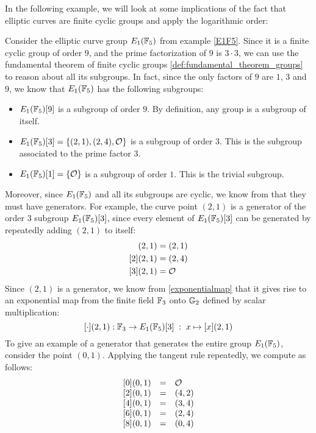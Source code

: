 In the following example, we will look at some implications of the fact that elliptic curves are finite cyclic groups and apply the logarithmic order:
\begin{example}\label{ex:G1G2-subgroups} Consider the elliptic curve group $E_1(\F_5)$ from example \ref{E1F5}. Since it is a finite cyclic group of order $9$, and the prime factorization of $9$ is $3\cdot 3$, we can use the fundamental theorem of finite cyclic groups \ref{def:fundamental_theorem_groups} to reason about all its subgroups. In fact, since the only  factors of $9$ are $1$, $3$ and $9$, we know that $E_1(\F_5)$ has the following subgroups:
\begin{itemize}
\item $E_1(\F_5)[9]$ is a subgroup of order $9$. By definition, any group is a subgroup of itself.
\item $E_1(\F_5)[3] = \{(2,1),(2,4),\Oinf\}$ is a subgroup of order $3$. This is the subgroup associated to the prime factor $3$.
\item $E_1(\F_5)[1] = \{\Oinf\}$ is a subgroup of order $1$. This is the trivial subgroup.
\end{itemize}
Moreover, since $E_1(\F_5)$ and all its subgroups are cyclic, we know from \pageref{cyclic-groups} that they must have generators. For example, the curve point $(2,1)$ is a generator of the order $3$ subgroup $E_1(\F_5)[3]$, since every element of $E_1(\F_5)[3]$ can be generated by repeatedly adding $(2,1)$ to itself: 
\begin{align*}
[1](2,1) & = (2,1) \\
[2](2,1) & = (2,4) \\
[3](2,1) & = \Oinf
\end{align*}
Since $(2,1)$ is a generator, we know from \ref{exponentialmap} that it gives rise to an exponential map from the finite field $\F_3$ onto $\G_2$ defined by scalar multiplication:
$$
[\cdot](2,1): \F_3 \to E_1(\F_5)[3]\; : \; x\mapsto [x](2,1) 
$$
To give an example of a generator that generates the entire group $E_1(\F_5)$, consider the point $(0,1)$. Applying the tangent rule repeatedly, we compute as follows:
$$
\begin{array}{lccr}
{}\begin{array}{lcl}
{}[0](0,1) &=& \Oinf \\
{}[2](0,1) &=& (4, 2) \\ 
{}[4](0,1) &=& (3, 4) \\ 
{}[6](0,1) &=& (2, 4) \\ 
{}[8](0,1) &=& (0, 4) \\ 

\end{array}
\end{array}$$
\end{example}
